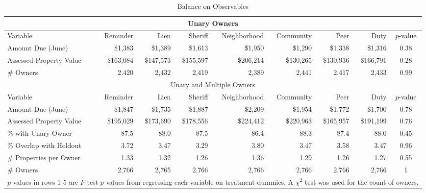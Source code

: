 \begin{sidewaystable}[ht]
\centering
\caption{Balance on Observables}
\label{balance2}
\begin{tabular}{lrrrrrrrc}
\hline
\multicolumn{9}{c}{Unary Owners} \\
  \hline
Variable & Reminder & Lien & Sheriff & Neighborhood & Community & Peer & Duty & $p$-value \\ 
   \hline
Amount Due (June) & \$1,383 & \$1,389 & \$1,613 & \$1,950 & \$1,290 & \$1,338 & \$1,316 & 0.38 \\ 
  Assessed Property Value & \$163,084 & \$147,573 & \$155,597 & \$206,214 & \$130,265 & \$130,936 & \$166,791 & 0.28 \\ 
  \# Owners & 2,420 & 2,432 & 2,419 & 2,389 & 2,441 & 2,417 & 2,433 & 0.99 \\ 
  \hline
\multicolumn{9}{c}{Unary and Multiple Owners} \\
  \hline
Variable & Reminder & Lien & Sheriff & Neighborhood & Community & Peer & Duty & $p$-value \\ 
   \hline
Amount Due (June) & \$1,847 & \$1,735 & \$1,887 & \$2,209 & \$1,954 & \$1,772 & \$1,700 & 0.78 \\ 
  Assessed Property Value & \$195,029 & \$173,690 & \$178,556 & \$224,412 & \$220,963 & \$165,957 & \$191,199 & 0.76 \\ 
  \% with Unary Owner & 87.5 & 88.0 & 87.5 & 86.4 & 88.3 & 87.4 & 88.0 & 0.45 \\ 
  \% Overlap with Holdout & 3.72 & 3.47 & 3.29 & 3.80 & 3.47 & 3.58 & 3.47 & 0.96 \\ 
  \# Properties per Owner & 1.33 & 1.32 & 1.26 & 1.36 & 1.29 & 1.26 & 1.27 & 0.55 \\ 
  \# Owners & 2,766 & 2,765 & 2,766 & 2,766 & 2,766 & 2,766 & 2,766 & 1 \\ 
  \hline
\multicolumn{9}{l}{\scriptsize{$p$-values in rows 1-5 are $F$-test $p$-values from regressing each variable on treatment dummies. A $\chi^2$ test was used for the count of owners.}} \\
\end{tabular}
\end{sidewaystable}

